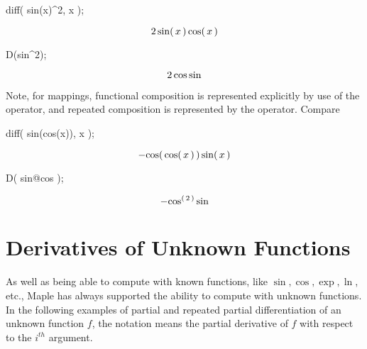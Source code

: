 \documentclass[11pt,dvips]{mtn}
\begin{document}
\begin{mapleinput}
diff( sin(x)^2, x );
\end{mapleinput}
\begin{maplelatex}
\[
2\,{\rm sin}(\,{x}\,)\,{\rm cos}(\,{x}\,)
\]
\end{maplelatex}
\begin{mapleinput}
D(sin^2);
\end{mapleinput}
\begin{maplelatex}
\[
2\,{\rm cos}\,{\rm sin}
\]
\end{maplelatex}

Note, for mappings, functional composition is represented
explicitly by use of the  operator, and repeated composition
is represented by the  operator.  Compare

\begin{mapleinput}
diff( sin(cos(x)), x );
\end{mapleinput}
\begin{maplelatex}
\[
 - {\rm cos}(\,{\rm cos}(\,{x}\,)\,)\,{\rm sin}(\,{x}\,)
\]
\end{maplelatex}
\begin{mapleinput}
D( sin@cos );
\end{mapleinput}
\begin{maplelatex}
\[
 - {\rm cos}^{(\,2\,)}\,{\rm sin}
\]
\end{maplelatex}

\section{Derivatives of Unknown Functions}

As well as being able to compute with known functions, like
$\sin, \cos, \exp, \ln$, etc., Maple has always supported the ability to
compute with unknown functions.  In the following examples
of partial and repeated partial differentiation of an unknown function $f$, the
notation  means the partial derivative of $f$ with
respect to the $i^{th}$ argument.
\end{document}
